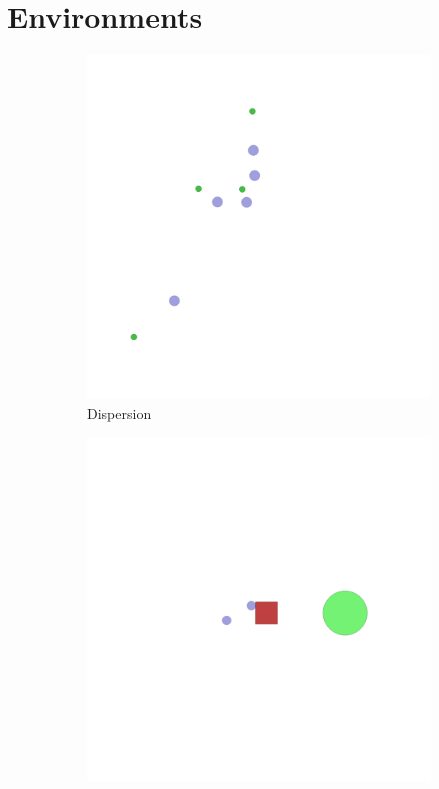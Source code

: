

\section{Environments}\label{apx:scenarios}
\begin{figure}
    \centering
    \begin{subfigure}{0.24\textwidth}
        \includegraphics[width=\textwidth]{figs/dispersion.png}
        \caption{Dispersion}
        \label{fig:dispersion}
    \end{subfigure}
    \begin{subfigure}{0.24\textwidth}
        \includegraphics[width=\textwidth]{figs/transport.png}

\end{subfigure}
\end{figure}
